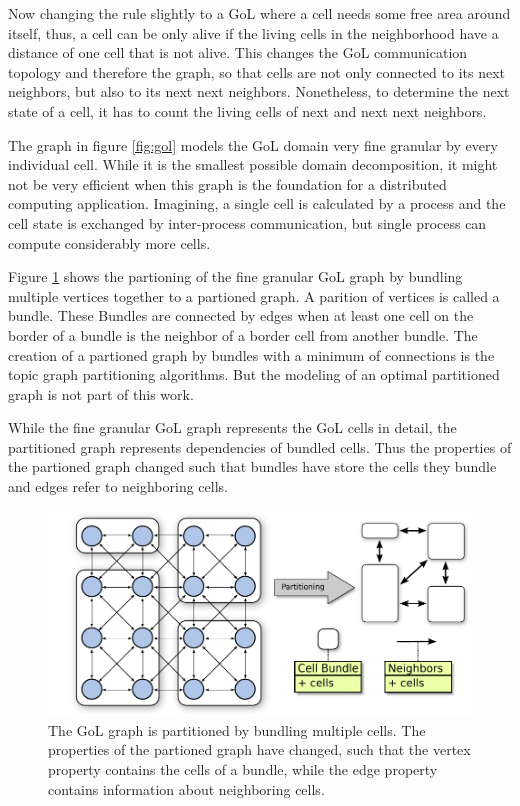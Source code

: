 Now changing the rule slightly to a GoL where a cell needs some free
area around itself, thus, a cell can be only alive if the living cells
in the neighborhood have a distance of one cell that is not
alive. This changes the GoL communication topology and therefore the
graph, so that cells are not only connected to its next neighbors, but
also to its next next neighbors. Nonetheless, to determine the next
state of a cell, it has to count the living cells of next and next
next neighbors.


The graph in figure \ref{fig:gol} models the GoL domain very fine
granular by every individual cell. While it is the smallest possible
domain decomposition, it might not be very efficient when this graph
is the foundation for a distributed computing application. Imagining, a
single cell is calculated by a process and the cell state is exchanged
by inter-process communication, but single process can compute
considerably more cells.


Figure \ref{fig:gol_bundle} shows the partioning of the fine granular
GoL graph by bundling multiple vertices together to a partioned
graph. A parition of vertices is called a bundle. These Bundles are
connected by edges when at least one cell on the border of a bundle
is the neighbor of a border cell from another bundle.  The creation of
a partioned graph by bundles with a minimum of connections is the
topic graph partitioning algorithms. But the modeling of an optimal
partitioned graph is not part of this work.

While the fine granular GoL graph represents the GoL cells in detail, the
partitioned graph represents dependencies of bundled cells. Thus
the properties of the partioned graph changed such that bundles
have store the cells they bundle and edges refer to neighboring
cells.

\begin{figure}[H]
  \centering \includegraphics[width=\textwidth]{graphics/30_gol_bundle}
  \caption{The GoL graph is partitioned by bundling multiple
    cells. The properties of the partioned graph have changed, such
    that the vertex property contains the cells of a bundle, while the
    edge property contains information about neighboring cells.}
  \label{fig:gol_bundle}
\end{figure}

